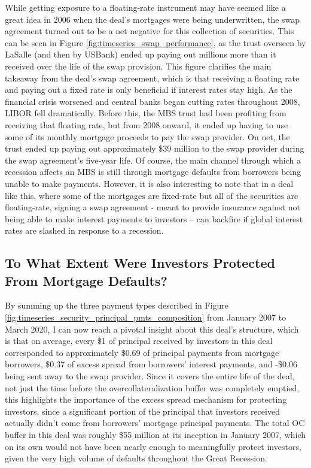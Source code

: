 \documentclass[12pt]{article}
\begin{document}
While getting exposure to a floating-rate instrument may have seemed like a great idea in 2006 when the deal’s mortgages were being underwritten, the swap agreement turned out to be a net negative for this collection of securities. This can be seen in Figure \ref{fig:timeseries_swap_performance}, as the trust overseen by LaSalle (and then by USBank) ended up paying out millions more than it received over the life of the swap provision. This figure clarifies the main takeaway from the deal's swap agreement, which is that receiving a floating rate and paying out a fixed rate is only beneficial if interest rates stay high. As the financial crisis worsened and central banks began cutting rates throughout 2008, LIBOR fell dramatically. Before this, the MBS trust had been profiting from receiving that floating rate, but from 2008 onward, it ended up having to use some of its monthly mortgage proceeds to pay the swap provider. On net, the trust ended up paying out approximately \$39 million to the swap provider during the swap agreement’s five-year life. Of course, the main channel through which a recession affects an MBS is still through mortgage defaults from borrowers being unable to make payments. However, it is also interesting to note that in a deal like this, where some of the mortgages are fixed-rate but all of the securities are floating-rate, signing a swap agreement - meant to provide insurance against not being able to make interest payments to investors -- can backfire if global interest rates are slashed in response to a recession.


\subsection*{To What Extent Were Investors Protected From Mortgage Defaults?}

By summing up the three payment types described in Figure \ref{fig:timeseries_security_principal_pmts_composition} from January 2007 to March 2020, I can now reach a pivotal insight about this deal’s structure, which is that on average, every \$1 of principal received by investors in this deal corresponded to approximately \$0.69 of principal payments from mortgage borrowers, \$0.37 of excess spread from borrowers’ interest payments, and -\$0.06 being sent away to the swap provider. Since it covers the entire life of the deal, not just the time before the overcollateralization buffer was completely emptied, this highlights the importance of the excess spread mechanism for protecting investors, since a significant portion of the principal that investors received actually didn’t come from borrowers’ mortgage principal payments. The total OC buffer in this deal was roughly \$55 million at its inception in January 2007, which on its own would not have been nearly enough to meaningfully protect investors, given the very high volume of defaults throughout the Great Recession.
\end{document}
